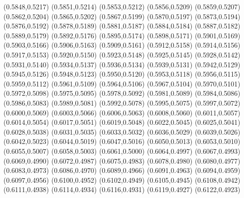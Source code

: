 \PST@Cross(0.5848,0.5217)
\PST@Cross(0.5851,0.5214)
\PST@Cross(0.5853,0.5212)
\PST@Cross(0.5856,0.5209)
\PST@Cross(0.5859,0.5207)
\PST@Cross(0.5862,0.5204)
\PST@Cross(0.5865,0.5202)
\PST@Cross(0.5867,0.5199)
\PST@Cross(0.5870,0.5197)
\PST@Cross(0.5873,0.5194)
\PST@Cross(0.5876,0.5192)
\PST@Cross(0.5878,0.5189)
\PST@Cross(0.5881,0.5187)
\PST@Cross(0.5884,0.5184)
\PST@Cross(0.5887,0.5182)
\PST@Cross(0.5889,0.5179)
\PST@Cross(0.5892,0.5176)
\PST@Cross(0.5895,0.5174)
\PST@Cross(0.5898,0.5171)
\PST@Cross(0.5901,0.5169)
\PST@Cross(0.5903,0.5166)
\PST@Cross(0.5906,0.5163)
\PST@Cross(0.5909,0.5161)
\PST@Cross(0.5912,0.5158)
\PST@Cross(0.5914,0.5156)
\PST@Cross(0.5917,0.5153)
\PST@Cross(0.5920,0.5150)
\PST@Cross(0.5923,0.5148)
\PST@Cross(0.5925,0.5145)
\PST@Cross(0.5928,0.5142)
\PST@Cross(0.5931,0.5140)
\PST@Cross(0.5934,0.5137)
\PST@Cross(0.5936,0.5134)
\PST@Cross(0.5939,0.5131)
\PST@Cross(0.5942,0.5129)
\PST@Cross(0.5945,0.5126)
\PST@Cross(0.5948,0.5123)
\PST@Cross(0.5950,0.5120)
\PST@Cross(0.5953,0.5118)
\PST@Cross(0.5956,0.5115)
\PST@Cross(0.5959,0.5112)
\PST@Cross(0.5961,0.5109)
\PST@Cross(0.5964,0.5106)
\PST@Cross(0.5967,0.5104)
\PST@Cross(0.5970,0.5101)
\PST@Cross(0.5972,0.5098)
\PST@Cross(0.5975,0.5095)
\PST@Cross(0.5978,0.5092)
\PST@Cross(0.5981,0.5089)
\PST@Cross(0.5984,0.5086)
\PST@Cross(0.5986,0.5083)
\PST@Cross(0.5989,0.5081)
\PST@Cross(0.5992,0.5078)
\PST@Cross(0.5995,0.5075)
\PST@Cross(0.5997,0.5072)
\PST@Cross(0.6000,0.5069)
\PST@Cross(0.6003,0.5066)
\PST@Cross(0.6006,0.5063)
\PST@Cross(0.6008,0.5060)
\PST@Cross(0.6011,0.5057)
\PST@Cross(0.6014,0.5054)
\PST@Cross(0.6017,0.5051)
\PST@Cross(0.6019,0.5048)
\PST@Cross(0.6022,0.5045)
\PST@Cross(0.6025,0.5041)
\PST@Cross(0.6028,0.5038)
\PST@Cross(0.6031,0.5035)
\PST@Cross(0.6033,0.5032)
\PST@Cross(0.6036,0.5029)
\PST@Cross(0.6039,0.5026)
\PST@Cross(0.6042,0.5023)
\PST@Cross(0.6044,0.5019)
\PST@Cross(0.6047,0.5016)
\PST@Cross(0.6050,0.5013)
\PST@Cross(0.6053,0.5010)
\PST@Cross(0.6055,0.5007)
\PST@Cross(0.6058,0.5003)
\PST@Cross(0.6061,0.5000)
\PST@Cross(0.6064,0.4997)
\PST@Cross(0.6067,0.4993)
\PST@Cross(0.6069,0.4990)
\PST@Cross(0.6072,0.4987)
\PST@Cross(0.6075,0.4983)
\PST@Cross(0.6078,0.4980)
\PST@Cross(0.6080,0.4977)
\PST@Cross(0.6083,0.4973)
\PST@Cross(0.6086,0.4970)
\PST@Cross(0.6089,0.4966)
\PST@Cross(0.6091,0.4963)
\PST@Cross(0.6094,0.4959)
\PST@Cross(0.6097,0.4956)
\PST@Cross(0.6100,0.4952)
\PST@Cross(0.6102,0.4949)
\PST@Cross(0.6105,0.4945)
\PST@Cross(0.6108,0.4942)
\PST@Cross(0.6111,0.4938)
\PST@Cross(0.6114,0.4934)
\PST@Cross(0.6116,0.4931)
\PST@Cross(0.6119,0.4927)
\PST@Cross(0.6122,0.4923)

